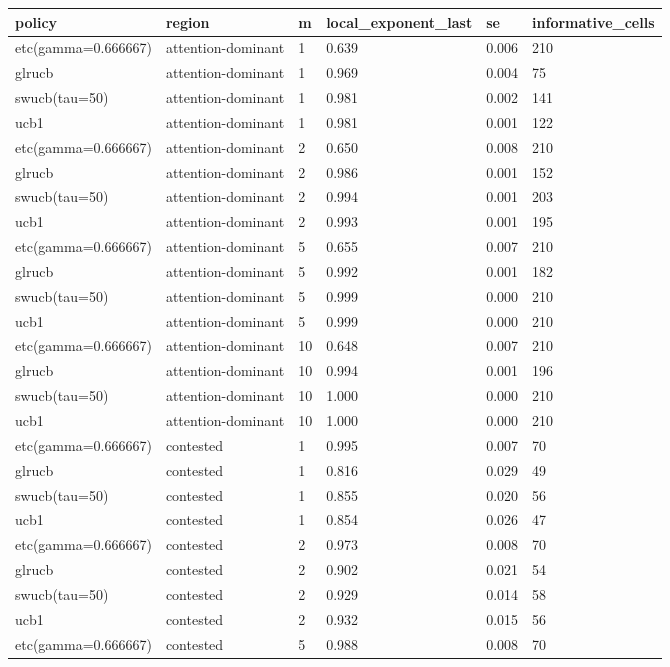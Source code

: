 \begin{tabular}{llllll}
\toprule
policy & region & m & local\_exponent\_last & se & informative\_cells \\
\midrule
etc(gamma=0.666667) & attention-dominant & 1 & 0.639 & 0.006 & 210 \\
glrucb & attention-dominant & 1 & 0.969 & 0.004 & 75 \\
swucb(tau=50) & attention-dominant & 1 & 0.981 & 0.002 & 141 \\
ucb1 & attention-dominant & 1 & 0.981 & 0.001 & 122 \\
etc(gamma=0.666667) & attention-dominant & 2 & 0.650 & 0.008 & 210 \\
glrucb & attention-dominant & 2 & 0.986 & 0.001 & 152 \\
swucb(tau=50) & attention-dominant & 2 & 0.994 & 0.001 & 203 \\
ucb1 & attention-dominant & 2 & 0.993 & 0.001 & 195 \\
etc(gamma=0.666667) & attention-dominant & 5 & 0.655 & 0.007 & 210 \\
glrucb & attention-dominant & 5 & 0.992 & 0.001 & 182 \\
swucb(tau=50) & attention-dominant & 5 & 0.999 & 0.000 & 210 \\
ucb1 & attention-dominant & 5 & 0.999 & 0.000 & 210 \\
etc(gamma=0.666667) & attention-dominant & 10 & 0.648 & 0.007 & 210 \\
glrucb & attention-dominant & 10 & 0.994 & 0.001 & 196 \\
swucb(tau=50) & attention-dominant & 10 & 1.000 & 0.000 & 210 \\
ucb1 & attention-dominant & 10 & 1.000 & 0.000 & 210 \\
etc(gamma=0.666667) & contested & 1 & 0.995 & 0.007 & 70 \\
glrucb & contested & 1 & 0.816 & 0.029 & 49 \\
swucb(tau=50) & contested & 1 & 0.855 & 0.020 & 56 \\
ucb1 & contested & 1 & 0.854 & 0.026 & 47 \\
etc(gamma=0.666667) & contested & 2 & 0.973 & 0.008 & 70 \\
glrucb & contested & 2 & 0.902 & 0.021 & 54 \\
swucb(tau=50) & contested & 2 & 0.929 & 0.014 & 58 \\
ucb1 & contested & 2 & 0.932 & 0.015 & 56 \\
etc(gamma=0.666667) & contested & 5 & 0.988 & 0.008 & 70 \\

\end{tabular}
